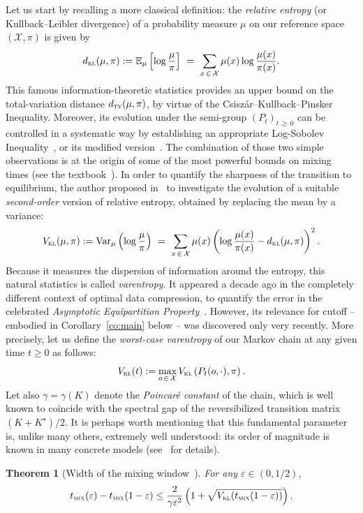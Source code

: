 \documentclass[10pt]{amsart}
\newtheorem{theo}{Theorem}[section]
\theoremstyle{definition}\newtheorem{defi}[theo]{Definition}\newtheorem{rema}[theo]{Remark}\newtheorem{exam}[theo]{Example}\newtheorem{exem}[theo]{Example}\newtheorem{nota}[theo]{Notation}
\newcommand{\EE}{{\mathbb{E}}}
\newcommand{\cX}{\mathcal{X}}
\newcommand{\dtv}{d_{\textsc{tv}}}
\newcommand{\dkl}{d_{\textsc{kl}}}
\newcommand{\vkl}{V_{\textsc{kl}}}
\newcommand{\tmix}{t_{\textsc{mix}}}
\newcommand{\var}{{\mathrm{Var}}}
\begin{document}
Let us start by recalling a more classical definition: the \emph{relative entropy} (or Kullback--Leibler divergence) of a probability measure $\mu$ on our reference space $(\cX,\pi)$ is given by
\[
\dkl(\mu,\pi) := \EE_\mu\left[\log\frac{\mu}{\pi}\right] \ = \ \sum_{x\,\in\,\cX}\mu(x)\log\frac{\mu(x)}{\pi(x)}.
\]
This famous information-theoretic statistics provides an upper bound on the total-variation distance $\dtv(\mu,\pi)$, by virtue of the Csisz\'ar--Kullback--Pinsker Inequality. Moreover, its evolution under the semi-group $(P_t)_{t\,\ge\,0}$ can be controlled in a systematic way by establishing an appropriate Log-Sobolev Inequality~\cite{MR1410112}, or its modified version~\cite{MR2283379}. The combination of those two simple observations is at the origin of some of the most powerful bounds on mixing times (see the textbook~\cite{MR2341319}). In order to quantify the sharpness of the transition to equilibrium, the author proposed in~\cite{arxiv.2102.05597} to investigate the evolution of a suitable
\emph{second-order} version of relative entropy, obtained by replacing the mean by a variance:
\[
\vkl(\mu,\pi) := \var_\mu\left(\log\frac{\mu}{\pi}\right) \ = \ \sum_{x\,\in\,\cX}\mu(x)\left(\log\frac{\mu(x)}{\pi(x)}-\dkl(\mu,\pi)\right)^2.
\]
Because it measures the dispersion of information around the entropy, this natural statistics is called \emph{varentropy}. It appeared a decade ago in the completely different context of optimal data compression, to quantify the error in the celebrated \emph{Asymptotic Equipartition Property}~\cite{inproceedings}. However, its relevance for cutoff -- embodied in Corollary~\ref{co:main} below -- was discovered only very recently. More precisely, let us define the \emph{worst-case varentropy} of our Markov chain at any given time $t\ge 0$ as follows:
\[
\vkl(t) := \max_{o\,\in\,\cX}\vkl\left(P_t(o,\cdot),\pi\right).
\]
Let also $\gamma=\gamma(K)$ denote the \emph{Poincar\'e constant} of the chain, which is well known to coincide with the spectral gap of the reversibilized transition matrix $(K+K^\star)/2$. It is perhaps worth mentioning that this fundamental parameter is, unlike many others, extremely well understood: its order of magnitude is known in many concrete models (see~\cite{MR2341319} for details).


\begin{theo}[{Width of the mixing window~\cite{arxiv.2102.05597}}]\label{th:varentropy}
For any $\varepsilon \in(0,1/2)$,
\[
\tmix(\varepsilon)-\tmix(1-\varepsilon) \le \frac{2}{\gamma \varepsilon^2}\left(1+\sqrt{\vkl(\tmix(1-\varepsilon))}\right).
\]
\end{theo}
\end{document}

